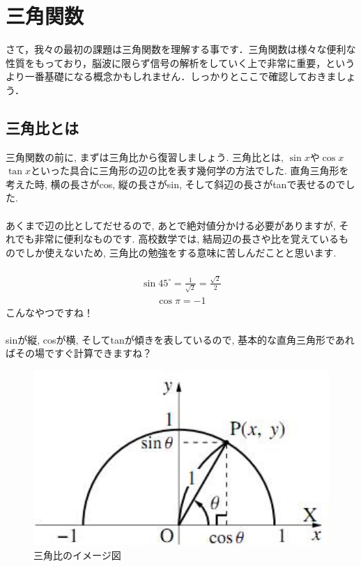 \documentclass[11pt,a4paper,uplatex]{ujreport}
\begin{document}
\chapter{三角関数 \label{trigonometry}}
さて，我々の最初の課題は三角関数を理解する事です．三角関数は様々な便利な性質をもっており，脳波に限らず信号の解析をしていく上で非常に重要，というより一番基礎になる概念かもしれません．しっかりとここで確認しておきましょう．

\section{三角比とは}
三角関数の前に, まずは三角比から復習しましょう. 三角比とは, $\sin x$や$\cos x$ $\tan x$といった具合に三角形の辺の比を表す幾何学の方法でした. 直角三角形を考えた時, 横の長さがcos, 縦の長さがsin, そして斜辺の長さがtanで表せるのでした. \\
\\

あくまで辺の比としてだせるので, あとで絶対値分かける必要がありますが, それでも非常に便利なものです. 高校数学では, 結局辺の長さや比を覚えているものでしか使えないため, 三角比の勉強をする意味に苦しんだことと思います.\\
\\
\begin{eqnarray}
\sin 45^\circ = \frac{1}{\sqrt{2}} = \frac{\sqrt{2}}2
\end{eqnarray}
\begin{eqnarray}
\cos \pi = -1
\end{eqnarray}
こんなやつですね！\\
\\
sinが縦, cosが横, そしてtanが傾きを表しているので, 基本的な直角三角形であればその場ですぐ計算できますね？\\

\begin{figure}[H]
\label{im:trigonometry}
  \centering
  \includegraphics[width=120mm,bb=0 0 287 170]{../figures/trigonometry.png}
  \caption{三角比のイメージ図}
\end{figure}
\end{document}
